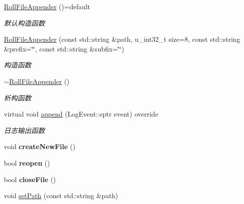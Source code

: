 \begin{DoxyCompactItemize}
\item 
\mbox{\label{classRollFileAppender_a2f879d661d078c287d9e29a6cd9a5783}} 
\hyperlink{classRollFileAppender_a2f879d661d078c287d9e29a6cd9a5783}{Roll\+File\+Appender} ()=default
\begin{DoxyCompactList}\small\item\em 默认构造函数 \end{DoxyCompactList}\item 
\hyperlink{classRollFileAppender_a454d6f5e48a3951bf199e05e95008617}{Roll\+File\+Appender} (const std\+::string \&path, u\+\_\+int32\+\_\+t size=8, const std\+::string \&prefix=\char`\"{}\char`\"{}, const std\+::string \&subfix=\char`\"{}\char`\"{})
\begin{DoxyCompactList}\small\item\em 构造函数 \end{DoxyCompactList}\item 
\mbox{\label{classRollFileAppender_a2f86ae28f8be1e660f9ef056488ed441}} 
\hyperlink{classRollFileAppender_a2f86ae28f8be1e660f9ef056488ed441}{$\sim$\+Roll\+File\+Appender} ()
\begin{DoxyCompactList}\small\item\em 析构函数 \end{DoxyCompactList}\item 
virtual void \hyperlink{classRollFileAppender_a9df3b9f03f53004d42dddc8400d26922}{append} (Log\+Event\+::sptr event) override
\begin{DoxyCompactList}\small\item\em 日志输出函数 \end{DoxyCompactList}\item 
\mbox{\label{classRollFileAppender_a37ee78e513093c9faeb894caf6123353}} 
void {\bfseries create\+New\+File} ()
\item 
\mbox{\label{classRollFileAppender_afc8e357a27913828517d73c5ca520fc4}} 
bool {\bfseries reopen} ()
\item 
\mbox{\label{classRollFileAppender_a899c4f9bdc3ee40c5ea2557a7a5e4aab}} 
bool {\bfseries close\+File} ()
\item 
void \hyperlink{classRollFileAppender_abdaa9cccf00ddf5ca767b597fda3d546}{set\+Path} (const std\+::string \&path)

\end{DoxyCompactItemize}
